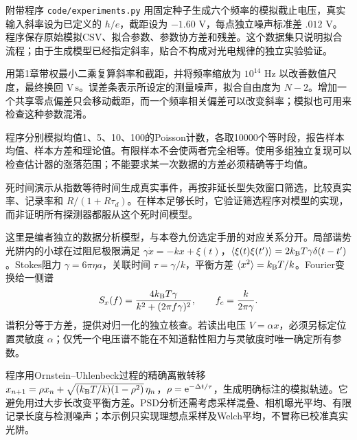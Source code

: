 附带程序 \texttt{code/experiments.py} 用固定种子生成六个频率的模拟截止电压，真实输入斜率设为已定义的 $h/e$，截距设为 $-1.60$ V，每点独立噪声标准差 $.012$ V。程序保存原始模拟CSV、拟合参数、参数协方差和残差。这个数据集只说明拟合流程；由于生成模型已经指定斜率，贴合不构成对光电规律的独立实验验证。

用第1章带权最小二乘复算斜率和截距，并将频率缩放为 $10^{14}$ Hz 以改善数值尺度，最终换回 $\mathrm{V\,s}$。误差条表示所设定的测量噪声，拟合自由度为 $N-2$。增加一个共享零点偏差只会移动截距，而一个频率相关偏差可以改变斜率；模拟也可用来检查这种参数混淆。

\begin{center}\end{center}

程序分别模拟均值1、5、10、100的Poisson计数，各取10000个等时段，报告样本均值、样本方差和理论值。有限样本不会使两者完全相等。使用多组独立复现可以检查估计器的涨落范围；不能要求某一次数据的方差必须精确等于均值。

死时间演示从指数等待时间生成真实事件，再按非延长型失效窗口筛选，比较真实率、记录率和 $R/(1+R\tau_d)$。在样本足够长时，它验证筛选程序对模型的实现，而非证明所有探测器都服从这个死时间模型。

这里是编者独立的数据分析模型，与本卷九份选定手册的对应关系分开。局部谐势光阱内的小球在过阻尼极限满足 $\gamma\dot x=-kx+\xi(t)$，$\langle \xi(t)\xi(t')\rangle=2k_{\mathrm B} T\gamma\delta(t-t')$。Stokes阻力 $\gamma=6\pi\eta a$，关联时间 $\tau=\gamma/k$，平衡方差 $\langle x^2\rangle=k_{\mathrm B} T/k$。Fourier变换给一侧谱
\[
S_x(f)=\frac{4k_{\mathrm B} T\gamma}{k^2+(2\pi f\gamma)^2},\qquad f_c=\frac{k}{2\pi\gamma}.
\]
谱积分等于方差，提供对归一化的独立核查。若读出电压 $V=\alpha x$，必须另标定位置灵敏度 $\alpha$；仅凭一个电压谱不能在不知道黏性阻力与灵敏度时唯一确定所有参数。

程序用Ornstein--Uhlenbeck过程的精确离散转移 $x_{n+1}=\rho x_n+\sqrt{(k_{\mathrm B} T/k)(1-\rho^2)}\,\eta_n$，$\rho=\mathrm e^{-\Delta t/\tau}$，生成明确标注的模拟轨迹。它避免用过大步长改变平衡方差。PSD分析还需考虑采样混叠、相机曝光平均、有限记录长度与检测噪声；本示例只实现理想点采样及Welch平均，不冒称已校准真实光阱。

